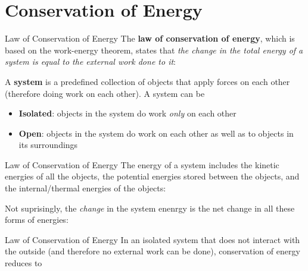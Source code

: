 \documentclass[12pt,compress,aspectratio=169]{beamer}
\begin{document}
\section{Conservation of Energy}

\begin{frame}{Law of Conservation of Energy}
  The \textbf{law of conservation of energy}, which is based on the work-energy
  theorem, states that \emph{the change in the total energy of a system is
  equal to the external work done to it}:


  A \textbf{system} is a predefined collection of objects that apply forces
  on each other (therefore doing work on each other). A system can be
  \begin{itemize}
  \item\textbf{Isolated}: objects in the system do work \emph{only} on
    each other
  \item\textbf{Open}: objects in the system do work on each other as
    well as to objects in its surroundings
  \end{itemize}
\end{frame}



\begin{frame}{Law of Conservation of Energy}
  The energy of a system includes the kinetic energies of all the objects, the
  potential energies stored between the objects, and the internal/thermal
  energies of the objects:

  
  Not suprisingly, the \emph{change} in the system enenrgy is the net change
  in all these forms of energies:
  
\end{frame}



\begin{frame}{Law of Conservation of Energy}
  In an isolated system that does not interact with the outside (and therefore
  no external work can be done), conservation of energy reduces to

\end{frame}
\end{document}
